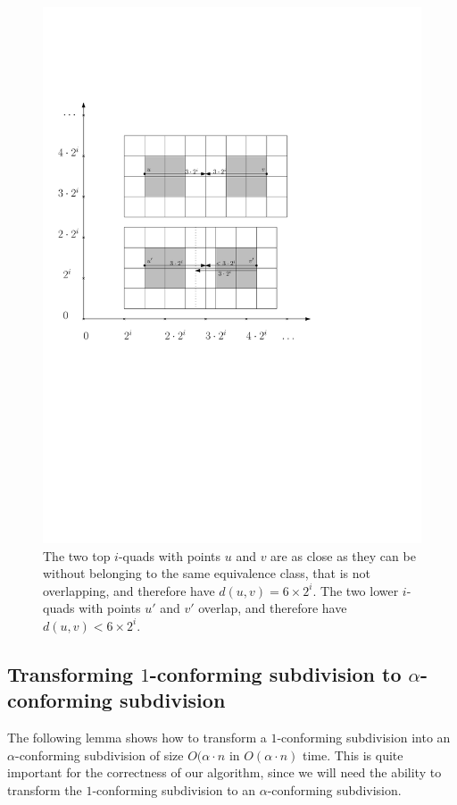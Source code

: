 \begin{figure}[H]
	\centering
	\includegraphics[width=\textwidth]{figures/lessthan6i.pdf}
	\caption{The two top $i$-quads with points $u$ and $v$ are as close as they can be without 
    		 belonging to the same equivalence class, that is not overlapping, and therefore have 
             $d(u,v) = 6 \times 2^i$. The two lower $i$-quads with points $u'$ and $v'$ overlap, and 
             therefore have $d(u,v) < 6 \times 2^i$.}
	\label{fig:lessthan6i}
\end{figure}

\subsection{Transforming $1$-conforming subdivision to $\alpha$-conforming subdivision}

The following lemma shows how to transform a $1$-conforming subdivision into an $\alpha$-conforming 
subdivision of size $O(\alpha\cdot n$ in $O(\alpha\cdot n)$ time. This is quite important for the 
correctness of our algorithm, since we will need the ability to transform the $1$-conforming 
subdivision to an $\alpha$-conforming subdivision.

